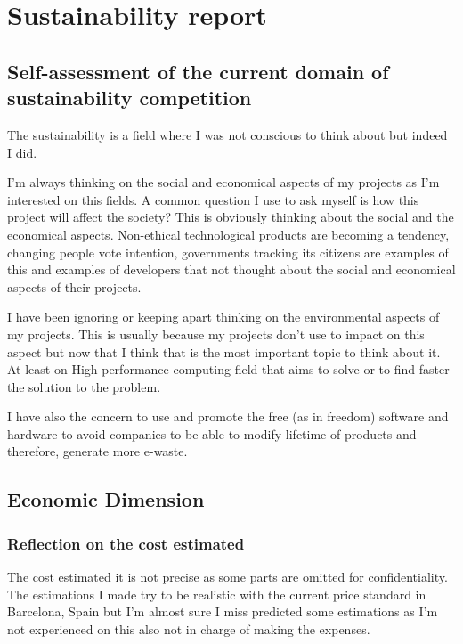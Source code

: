 \section{Sustainability report}

\subsection{Self-assessment of the current domain of sustainability competition}

\justify
The sustainability is a field where I was not conscious to think about but indeed I did.  

\justify
I'm always thinking on the social and economical aspects of my projects as I'm interested on this fields. A common question I use to ask myself is how this project will affect the society? This is obviously thinking about the social and the economical aspects. Non-ethical technological products are becoming a tendency, changing people vote intention, governments tracking its citizens are examples of this and examples of developers that not thought about the social and economical aspects of their projects.

\justify
I have been ignoring or keeping apart thinking on the environmental aspects of my projects. This is usually because my projects don't use to impact on this aspect but now that I think that is the most important topic to think about it. At least on High-performance computing field that aims to solve or to find faster the solution to the problem.

\justify
I have also the concern to use and promote the free (as in freedom) software and hardware to avoid companies to be able to modify lifetime of products and therefore, generate more e-waste.

\subsection{Economic Dimension}

\subsubsection{Reflection on the cost estimated}

\justify
The cost estimated it is not precise as some parts are omitted for confidentiality. The estimations I made try to be realistic with the current price standard in Barcelona, Spain but I'm almost sure I miss predicted some estimations as I'm not experienced on this also not in charge of making the expenses.

